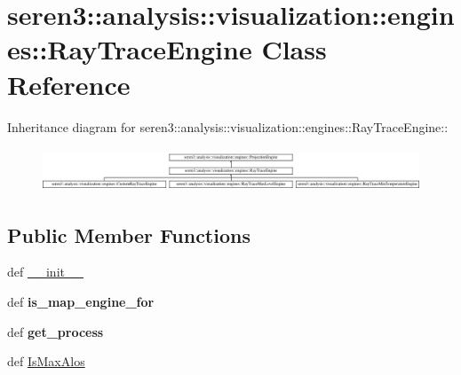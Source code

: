 \hypertarget{classseren3_1_1analysis_1_1visualization_1_1engines_1_1RayTraceEngine}{
\section{seren3::analysis::visualization::engines::RayTraceEngine Class Reference}
\label{classseren3_1_1analysis_1_1visualization_1_1engines_1_1RayTraceEngine}
}
Inheritance diagram for seren3::analysis::visualization::engines::RayTraceEngine::\begin{figure}[H]
\begin{center}
\leavevmode
\includegraphics[height=1.30841cm]{classseren3_1_1analysis_1_1visualization_1_1engines_1_1RayTraceEngine}
\end{center}
\end{figure}
\subsection*{Public Member Functions}
\begin{DoxyCompactItemize}
\item 
def \hyperlink{classseren3_1_1analysis_1_1visualization_1_1engines_1_1RayTraceEngine_ab8058104b78f72e69896142942a4a964}{\_\-\_\-init\_\-\_\-}
\item 
\hypertarget{classseren3_1_1analysis_1_1visualization_1_1engines_1_1RayTraceEngine_ae53837d5220069e5c96526e86ceae61f}{
def {\bfseries is\_\-map\_\-engine\_\-for}}
\label{classseren3_1_1analysis_1_1visualization_1_1engines_1_1RayTraceEngine_ae53837d5220069e5c96526e86ceae61f}

\item 
\hypertarget{classseren3_1_1analysis_1_1visualization_1_1engines_1_1RayTraceEngine_a5244189f9a126c0cffaf977b4be79c71}{
def {\bfseries get\_\-process}}
\label{classseren3_1_1analysis_1_1visualization_1_1engines_1_1RayTraceEngine_a5244189f9a126c0cffaf977b4be79c71}

\item 
def \hyperlink{classseren3_1_1analysis_1_1visualization_1_1engines_1_1RayTraceEngine_adaa78a86d554d76c6fd6063453b18d82}{IsMaxAlos}
\end{DoxyCompactItemize}


